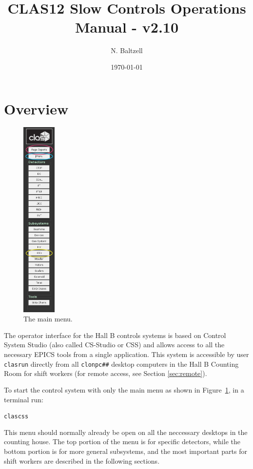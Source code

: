 \documentclass[amsmath,amssymb,notitlepage,11pt]{revtex4}
\begin{document}
\title{CLAS12 Slow Controls Operations Manual - v2.10}
\author{N. Baltzell}
\date{\today}
\begin{abstract}
\end{abstract}

\maketitle
\tableofcontents
\newpage

\section{Overview}

\begin{figure}\centering\vspace{1cm}
  \includegraphics[width=0.15\textwidth]{pics/mainmenu}
  \caption{The main menu.\label{fig:mainmenu}}
\end{figure}

The operator interface for the Hall B controls systems is based on Control System Studio (also called CS-Studio or CSS) and allows access to all the necessary EPICS tools from a single application.  This system is accessible by user \texttt{clasrun} directly from all \texttt{clonpc\#\#} desktop computers in the Hall B Counting Room for shift workers (for remote access, see Section \ref{sec:remote}).


To start the control system with only the main menu as shown in Figure~\ref{fig:mainmenu}, in a terminal run: \begin{center}\texttt{clascss}\end{center}  This menu should normally already be open on all the neccessary desktops in the counting house.  The top portion of the menu is for specific detectors, while the bottom portion is for more general subsystems, and the most important parts for shift workers are described in the following sections.
\end{document}
